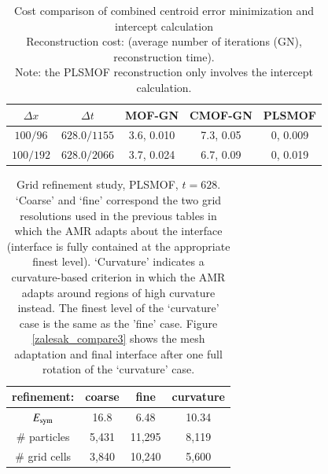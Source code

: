 \documentclass[preprint,12pt]{Definitions/elsarticle}
\newcommand{\tn}{\textnormal}
\begin{document}
\begin{table}[H]
	\centering
	\caption{Cost comparison of combined centroid error minimization and intercept calculation\\
		Reconstruction cost: (average number of iterations (GN), reconstruction time).\\
		Note: the PLSMOF reconstruction only involves the intercept calculation. }
	\renewcommand{\arraystretch}{1.2} 
	\begin{tabular}{|c|c|c|c|c|}
		\hline
		$\Delta x$ & $\Delta t$ & MOF-GN & CMOF-GN       & PLSMOF\\ \hline
		$100/96$ & $628.0/1155$ & 3.6, 0.010  & 7.3, 0.05 & 0, 0.009 \\ \hline
		$100/192$ & $628.0/2066$ & 3.7, 0.024  & 6.7, 0.09 & 0, 0.019 \\ \hline
	\end{tabular}
	\label{zalesakcost}
\end{table}

\begin{table}[H]
	\centering	
	\caption{Grid refinement study, PLSMOF, $t=628$.\\
		`Coarse' and `fine' correspond the two grid resolutions used in the previous tables in which the AMR adapts about the interface (interface is fully contained at the appropriate finest level). `Curvature' indicates a curvature-based criterion in which the AMR adapts around regions of high curvature instead. The finest level of the `curvature' case is the same as the 'fine' case. Figure \ref{zalesak_compare3} shows the mesh adaptation and final interface after one full rotation of the `curvature' case.}
	\renewcommand{\arraystretch}{1.2} %
	\begin{tabular}{|c|c|c|c|}
		\hline
		refinement: & coarse   & fine  & curvature
		\\ \hline 
		$E_\tn{sym}$ & 16.8  & 6.48  & 10.34
		\\ \hline 
		$\#$ particles & 5,431  & 11,295  & 8,119
		\\ \hline
		$\#$ grid cells & 3,840  & 10,240   & 5,600
		\\ \hline
	\end{tabular}  
	\label{zalesaktablerefine}	
\end{table}
\end{document}
